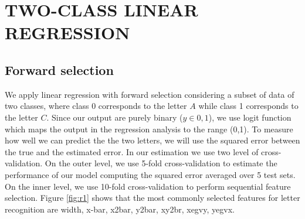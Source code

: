 \section{TWO-CLASS LINEAR REGRESSION}
\setcounter{section}{2}
\subsection{Forward selection}

We apply linear regression with forward selection considering a subset of data of two classes, where class 0 corresponds to the letter $A$ while class 1 corresponds to the letter $C$. Since our output are purely binary ($y \in {0,1}$), we use logit function which maps the output in the regression analysis to the range (0,1). To measure how well we can predict the the two letters, we will use the squared error between the true and the estimated error. In our estimation we  use two level of cross-validation. On the outer level, we use 5-fold cross-validation  to estimate the performance of our model computing the squared error averaged over 5 test sets. On the inner level, we use 10-fold cross-validation to perform sequential feature selection. Figure \ref{fig:r1} shows that the most commonly selected features for letter recognition are width, x-bar, x2bar, y2bar, xy2br, xegvy, yegvx.



